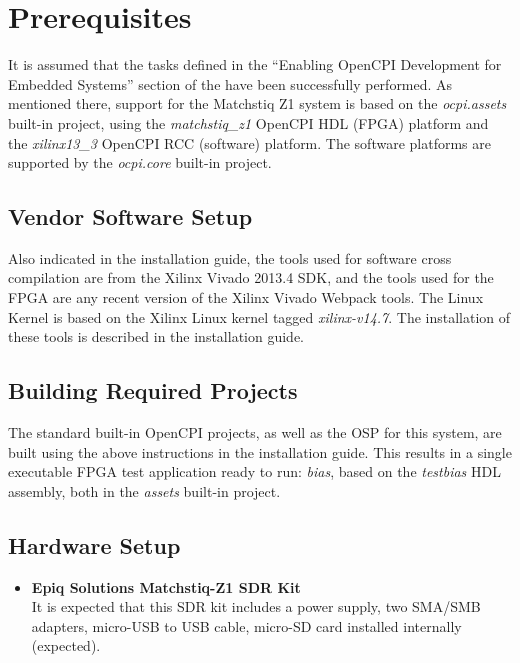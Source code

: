 \section{Prerequisites}
\begin{flushleft}
  It is assumed that the tasks defined in the ``Enabling OpenCPI Development for Embedded Systems'' section of the  have been successfully performed.
  As mentioned there, support for the Matchstiq Z1 system is based on the \textit{ocpi.assets} built-in project, using the \textit{matchstiq\_z1} OpenCPI HDL (FPGA) platform and the \textit{xilinx13\_3 }OpenCPI RCC (software) platform.  The software platforms are supported by the \textit{ocpi.core} built-in project.

\subsection{Vendor Software Setup}
  Also indicated in the installation guide, the tools used for software cross compilation are from the Xilinx Vivado 2013.4 SDK, and the tools used for the FPGA are any recent version of the Xilinx Vivado Webpack tools.  The Linux Kernel is based on the Xilinx Linux kernel tagged \textit{xilinx-v14.7}.  The installation of these tools is described in the installation guide.

\subsection{Building Required Projects}
\label{sec:Building OpenCPI projects}
The standard built-in OpenCPI projects, as well as the OSP for this system, are built using the above instructions in the installation guide.  This results in a single executable FPGA test application ready to run:  \textit{bias}, based on the \textit{testbias} HDL assembly, both in the \textit{assets} built-in project.

\subsection{Hardware Setup}
\begin{itemize}

\item \textbf{Epiq Solutions Matchstiq-Z1 SDR Kit}\\ \medskip
It is expected that this SDR kit includes a power supply, two SMA/SMB adapters, micro-USB to USB cable, micro-SD card installed internally (expected).


\end{itemize}
\end{flushleft}
